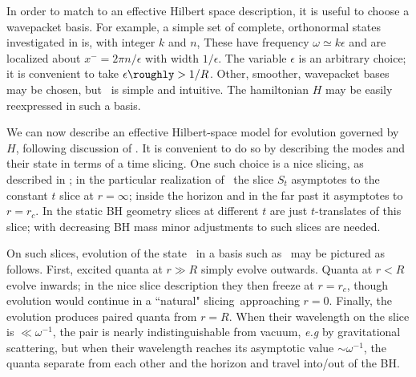 In order to match to an effective Hilbert space description, it is useful to choose a wavepacket basis.  For example, a simple set of complete, orthonormal states investigated in  is, with integer $k$ and $n$, 
%
\eqn{}
%
These have frequency $\omega\simeq k\epsilon$ and are localized about $x^-=2\pi n/\epsilon$ with width $1/\epsilon$.  The variable $\epsilon$ is an arbitrary choice; it is convenient to take $\epsilon\roughly> 1/R$.  Other, smoother, wavepacket bases may be chosen, but \wavebas\ is simple and intuitive.  The hamiltonian $H$ may be easily reexpressed in such a basis.


We can now describe an effective Hilbert-space model for evolution governed by $H$, following discussion of .  It is convenient to do so by describing the modes and their state in terms of a time slicing.  One such choice is a nice slicing, as described in ; in the particular realization of \NLvC\ the slice $S_t$ asymptotes to the constant $t$ slice at $r=\infty$; inside the horizon and in the far past it asymptotes to $r=r_c$.  In the static BH geometry slices at different $t$ are just $t$-translates of this slice; with decreasing BH mass minor adjustments to such slices are needed.

On such slices, evolution of the state \hawkstate\ in a basis such as \wavebas\ may be pictured as follows.  First, excited quanta at $r\gg R$ simply evolve outwards.  Quanta at $r<R$ evolve inwards; in the nice slice description they then freeze at $r=r_c$, though evolution would continue in a ``natural" slicing\NLvC\ approaching $r=0$.  Finally, the evolution produces paired quanta from $r=R$.  When their wavelength on the slice is $\ll \omega^{-1}$, the pair is nearly indistinguishable from vacuum, {\it e.g} by gravitational scattering\BHIUN, but when their wavelength reaches its asymptotic value $\sim \omega^{-1}$, the quanta separate from each other and the horizon and travel into/out of the BH.  

